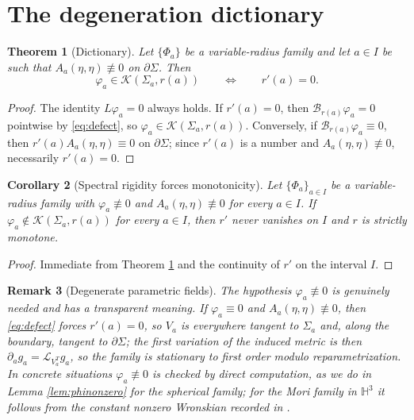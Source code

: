 \documentclass[10pt,a4paper]{amsart}
\newtheorem{theorem}{Theorem}[section]
\newtheorem{corollary}[theorem]{Corollary}
\newtheorem{remark}[theorem]{Remark}
\newcommand{\Hyp}{\mathbb{H}}
\newcommand{\Ker}{\mathcal{K}}
\begin{document}
\section{The degeneration dictionary}\label{sec:dictionary}

\begin{theorem}[Dictionary]\label{thm:dictionary}
Let $\{\Phi_a\}$ be a variable-radius family and let $a\in I$ be such that $A_a(\eta,\eta)\not\equiv 0$ on $\partial\Sigma$. Then
\[
\varphi_a\in\Ker(\Sigma_a,r(a))\qquad\Longleftrightarrow\qquad r'(a)=0 .
\]
\end{theorem}

\begin{proof}
The identity $L\varphi_a=0$ always holds. If $r'(a)=0$, then $\mathcal{B}_{r(a)}\varphi_a=0$ pointwise by \eqref{eq:defect}, so $\varphi_a\in\Ker(\Sigma_a,r(a))$. Conversely, if $\mathcal{B}_{r(a)}\varphi_a\equiv 0$, then $r'(a)A_a(\eta,\eta)\equiv 0$ on $\partial\Sigma$; since $r'(a)$ is a number and $A_a(\eta,\eta)\not\equiv 0$, necessarily $r'(a)=0$.
\end{proof}

\begin{corollary}[Spectral rigidity forces monotonicity]\label{cor:monotone}
Let $\{\Phi_a\}_{a\in I}$ be a variable-radius family with $\varphi_a\not\equiv 0$ and $A_a(\eta,\eta)\not\equiv 0$ for every $a\in I$. If $\varphi_a\notin\Ker(\Sigma_a,r(a))$ for every $a\in I$, then $r'$ never vanishes on $I$ and $r$ is strictly monotone.
\end{corollary}

\begin{proof}
Immediate from Theorem \ref{thm:dictionary} and the continuity of $r'$ on the interval $I$.
\end{proof}

\begin{remark}[Degenerate parametric fields]\label{rem:degenerate}
The hypothesis $\varphi_a\not\equiv 0$ is genuinely needed and has a transparent meaning. If $\varphi_a\equiv 0$ and $A_a(\eta,\eta)\not\equiv 0$, then \eqref{eq:defect} forces $r'(a)=0$, so $V_a$ is everywhere tangent to $\Sigma_a$ and, along the boundary, tangent to $\partial\Sigma$; the first variation of the induced metric is then $\partial_ag_a=\mathcal{L}_{V_a^T}g_a$, so the family is stationary to first order modulo reparametrization. In concrete situations $\varphi_a\not\equiv 0$ is checked by direct computation, as we do in Lemma \ref{lem:phinonzero} for the spherical family; for the Mori family in $\Hyp^3$ it follows from the constant nonzero Wronskian recorded in \cite[Lem. 11.1]{P1}.
\end{remark}
\end{document}
